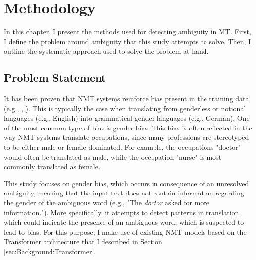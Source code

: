 \chapter{Methodology}
\label{ch:Methodology}


In this chapter, I present the methods used for detecting ambiguity in MT. First, I define the problem around ambiguity that this study attempts to solve. Then, I outline the systematic approach used to solve the problem at hand.

\section{Problem Statement}
\label{sec:Methodology:Problem}

It has been proven that NMT systems reinforce bias present in the training data (e.g., \citet{Prates_2019}, \citet{Stanovsky_2019}). This is typically the case when translating from genderless or notional languages (e.g., English) into grammatical gender languages (e.g., German). One of the most common type of bias is gender bias. 
This bias is often reflected in the way NMT systems translate occupations, since many professions are stereotyped to be either male or female dominated. For example, the occupations "doctor" would often be translated as male, while the occupation "nurse" is most commonly translated as female. 

This study focuses on gender bias, which occurs in consequence of an unresolved ambiguity, meaning that the input text does not contain information regarding the gender of the ambiguous word (e.g., "The \textit{doctor} asked for more information."). More specifically, it attempts to detect patterns in translation which could indicate the presence of an ambiguous word, which is suspected to lead to bias. For this purpose, I make use of existing NMT models based on the Transformer architecture that I described in Section \ref{sec:Background:Transformer}.
 

